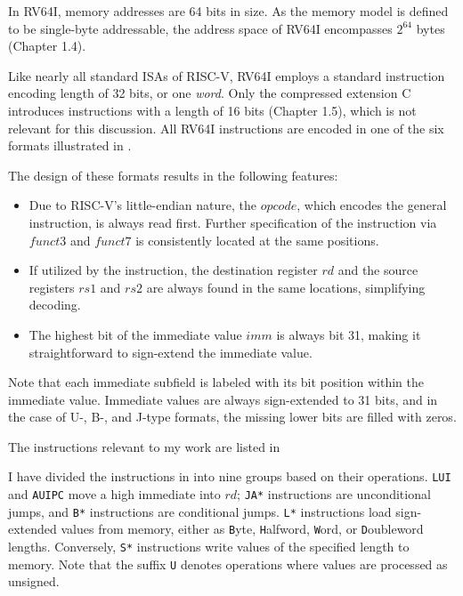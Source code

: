 In RV64I, memory addresses are 64 bits in size. As the memory model is defined to
be single-byte addressable, the address space of RV64I encompasses $2^{64}$ bytes
\cite{riscv-isa}(Chapter 1.4).

Like nearly all standard ISAs of RISC-V, RV64I employs a standard instruction
encoding length of 32 bits, or one \emph{word}. Only the compressed extension C
introduces instructions with a length of 16 bits \cite{riscv-isa}(Chapter 1.5),
which is not relevant for this discussion. All RV64I instructions are encoded in
one of the six formats illustrated in .



The design of these formats results in the following features:
\begin{itemize}
      \item Due to RISC-V's little-endian nature, the $opcode$, which encodes the general
            instruction, is always read first. Further specification of the
            instruction via $funct3$ and $funct7$ is consistently located at the same positions.
      \item If utilized by the instruction, the destination register $rd$ and the source
            registers $rs1$ and $rs2$ are always found in the same locations, simplifying decoding.
      \item The highest bit of the immediate value $imm$ is always bit 31, making it straightforward
            to sign-extend the immediate value.
\end{itemize}
Note that each immediate subfield is labeled with its bit position within the immediate value.
Immediate values are always sign-extended to 31 bits, and in the case of U-, B-, and J-type formats, the missing lower bits are filled with zeros.

The instructions relevant to my work are listed in

I have divided the instructions in  into nine groups based on their operations.
\texttt{LUI} and \texttt{AUIPC} move a high immediate into $rd$; \texttt{JA*} instructions are unconditional jumps, and \texttt{B*} instructions are conditional jumps.
\texttt{L*} instructions load sign-extended values from memory, either as \texttt{B}yte, \texttt{H}alfword, \texttt{W}ord, or \texttt{D}oubleword lengths.
Conversely, \texttt{S*} instructions write values of the specified length to memory.
Note that the suffix \texttt{U} denotes operations where values are processed as unsigned.

